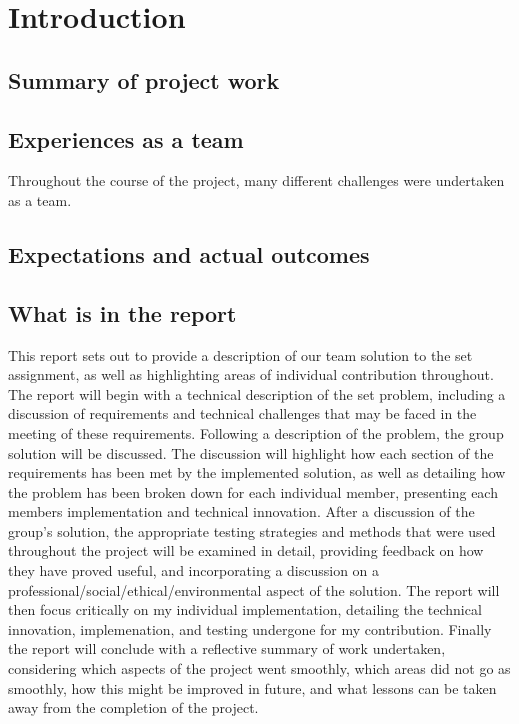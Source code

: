 \documentclass[a4paper]{report}
\begin{document}


\tableofcontents

\chapter{Introduction} 
\section{Summary of project work}

\section{Experiences as a team}
Throughout the course of the project, many different challenges were undertaken
as a team.  
\section{Expectations and actual outcomes}
\section{What is in the report}
This report sets out to provide a description of our team solution to the set 
assignment, as well as highlighting areas of individual contribution throughout.
The report will begin with a technical description of the set problem, 
including a discussion of requirements and technical challenges that may be 
faced in the meeting of these requirements. 
Following a description of the problem, the group solution will be discussed. 
The discussion will highlight how each section of the requirements has been met 
by the implemented solution, as well as detailing how the problem has been broken 
down for each individual member, presenting each members implementation and 
technical innovation. 
After a discussion of the group's solution, the appropriate testing strategies 
and methods that were used throughout the project will be examined in detail, 
providing feedback on how they have proved useful, and incorporating a 
discussion on a professional/social/ethical/environmental aspect of the solution.
The report will then focus critically on my individual implementation, 
detailing the technical innovation, implemenation, and testing undergone for my 
contribution. 
Finally the report will conclude with a reflective summary of work 
undertaken, considering which aspects of the project went smoothly, which areas
did not go as smoothly, how this might be improved in future, and what lessons 
can be taken away from the completion of the project. 
\end{document}

